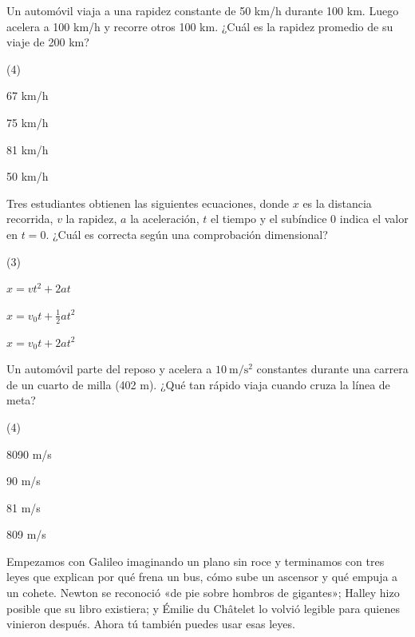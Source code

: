 \documentclass[11pt]{article}
\begin{document}
\begin{preguntas}
\pregunta Un automóvil viaja a una rapidez constante de 50 km/h durante 100 km. Luego acelera a
100 km/h y recorre otros 100 km. ¿Cuál es la rapidez promedio de su viaje de 200 km?
\begin{opciones*}(4)
  \item 67 km/h
  \item 75 km/h
  \item 81 km/h
  \item 50 km/h
\end{opciones*}

\pregunta Tres estudiantes obtienen las siguientes ecuaciones, donde $x$ es la distancia
recorrida, $v$ la rapidez, $a$ la aceleración, $t$ el tiempo y el subíndice 0 indica el valor
en $t = 0$. ¿Cuál es correcta según una comprobación dimensional?
\begin{opciones*}(3)
  \item $x = vt^{2} + 2at$
  \item $x = v_{0}t + \frac{1}{2}at^{2}$
  \item $x = v_{0}t + 2at^{2}$
\end{opciones*}

\pregunta Un automóvil parte del reposo y acelera a $10\ \mathrm{m/s^2}$ constantes durante una
carrera de un cuarto de milla (402 m). ¿Qué tan rápido viaja cuando cruza la línea de meta?
\begin{opciones*}(4)
  \item 8090 m/s
  \item 90 m/s
  \item 81 m/s
  \item 809 m/s
\end{opciones*}
\end{preguntas}


Empezamos con Galileo imaginando un plano sin roce y terminamos con tres leyes que explican
por qué frena un bus, cómo sube un ascensor y qué empuja a un cohete. Newton se reconoció
«de pie sobre hombros de gigantes»; Halley hizo posible que su libro existiera; y Émilie du
Châtelet lo volvió legible para quienes vinieron después. Ahora tú también puedes usar esas
leyes.
\end{document}
